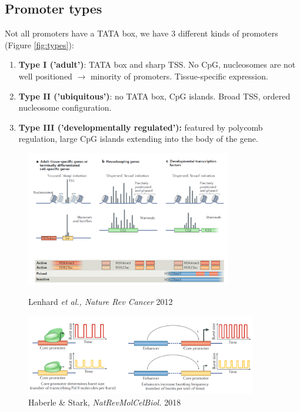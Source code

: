 \hypertarget{promoter-types}{%
\subsection{Promoter types}\label{promoter-types}}

Not all promoters have a TATA box, we have 3 different kinds of promoters (Figure  \ref{fig:types}):

\begin{enumerate}
\def\labelenumi{\arabic{enumi}.}
\tightlist
\item
  \textbf{Type I ('adult')}: TATA box and sharp TSS. No CpG, nucleosomes are not well positioned $\rightarrow$ minority of promoters. Tissue-specific expression.
\item
  \textbf{Type II ('ubiquitous')}: no TATA box, CpG islands. Broad TSS, ordered nucleosome configuration.
\item
  \textbf{Type III ('developmentally regulated'):} featured by polycomb regulation, large CpG islands extending into the body of the gene.
\end{enumerate}

\begin{figure}[!htb]
   \begin{minipage}{0.48\textwidth}
     \centering
   \includegraphics[width=0.8\textwidth]{../_resources/Screenshot_2022-10-05_at_10-05-59.png}
\caption{Lenhard \emph{et al., Nature Rev Cancer} 2012}
\label{fig:types}
   \end{minipage}\hfill
   \begin{minipage}{0.48\textwidth}
     \centering
 \includegraphics[width=0.9\textwidth]{../_resources/Screenshot_2022-10-10_at_10-50-43.png}
\caption{Haberle \& Stark, \emph{NatRevMolCelBiol.} 2018}
\label{fig:burst}
   \end{minipage}
\end{figure}

